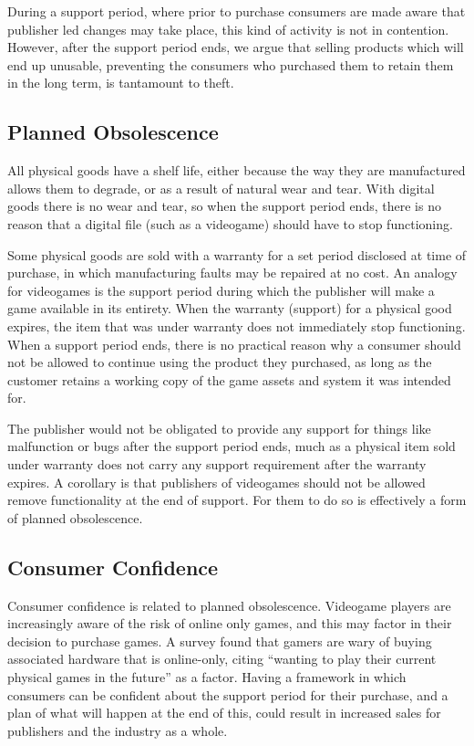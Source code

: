 During a support period, where prior to purchase consumers are made aware that publisher led changes may take place, this kind of activity is not in contention.
However, after the support period ends, we argue that selling products which will end up unusable, preventing the consumers who purchased them to retain them in the long term, is tantamount to theft.

\subsection{Planned Obsolescence}
All physical goods have a shelf life, either because the way they are manufactured allows them to degrade, or as a result of natural wear and tear.
With digital goods there is no wear and tear, so when the support period ends, there is no reason that a digital file (such as a videogame) should have to stop functioning.

Some physical goods are sold with a warranty for a set period disclosed at time of purchase, in which manufacturing faults may be repaired at no cost.
An analogy for videogames is the support period during which the publisher will make a game available in its entirety.
When the warranty (support) for a physical good expires, the item that was under warranty does not immediately stop functioning.
When a support period ends, there is no practical reason why a consumer should not be allowed to continue using the product they purchased,
as long as the customer retains a working copy of the game \glspl{asset} and system it was intended for.

The publisher would not be obligated to provide any support for things like malfunction or bugs after the support period ends,
much as a physical item sold under warranty does not carry any support requirement after the warranty expires.
A corollary is that publishers of videogames should not be allowed remove functionality at the end of support.
For them to do so is effectively a form of planned obsolescence.

\subsection{Consumer Confidence}
Consumer confidence is related to planned obsolescence.
Videogame players are increasingly aware of the risk of online only games,
and this may factor in their decision to purchase games\cn.
A survey found that gamers are wary of buying associated hardware that is online-only,
citing ``wanting to play their current physical games in the future'' as a factor\cite{console-wary-2019}.
Having a framework in which consumers can be confident about the support period for their purchase, and a plan of what will happen at the end of this,
could result in increased sales for publishers and the industry as a whole.

